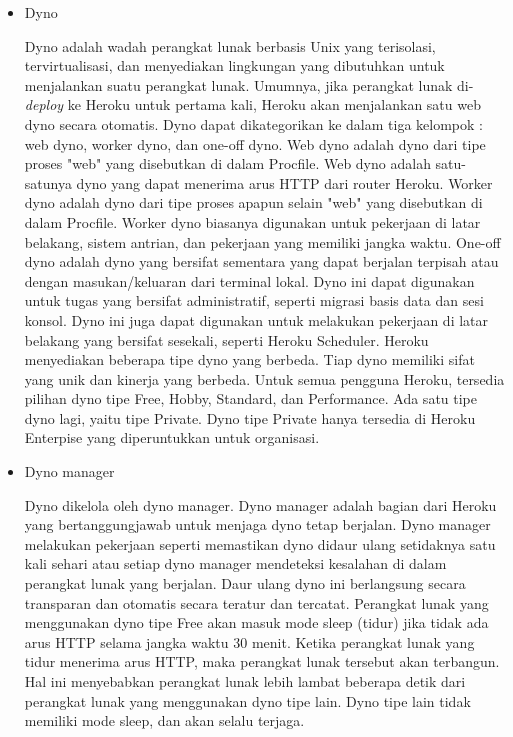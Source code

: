 \documentclass[a4paper,twoside]{article}
\begin{document}
\begin{enumerate}
\begin{itemize}
\begin{itemize}
\begin{itemize}
				\item Dyno
		
				Dyno adalah wadah perangkat lunak berbasis Unix yang terisolasi, tervirtualisasi, dan menyediakan lingkungan yang dibutuhkan untuk menjalankan suatu perangkat lunak. Umumnya, jika perangkat lunak di-\textit{deploy} ke Heroku untuk pertama kali, Heroku akan menjalankan satu web dyno secara otomatis. 
				Dyno dapat dikategorikan ke dalam tiga kelompok : web dyno, worker dyno, dan one-off dyno. Web dyno adalah dyno dari tipe proses "web" yang disebutkan di dalam Procfile. Web dyno adalah satu-satunya dyno yang dapat menerima arus HTTP dari router Heroku. Worker dyno adalah dyno dari tipe proses apapun selain "web" yang disebutkan di dalam Procfile. Worker dyno biasanya digunakan untuk pekerjaan di latar belakang, sistem antrian, dan pekerjaan yang memiliki jangka waktu. One-off dyno adalah dyno yang bersifat sementara yang dapat berjalan terpisah atau dengan masukan/keluaran dari terminal lokal. Dyno ini dapat digunakan untuk tugas yang bersifat administratif, seperti migrasi basis data dan sesi konsol. Dyno ini juga dapat digunakan untuk melakukan pekerjaan di latar belakang yang bersifat sesekali, seperti Heroku Scheduler.
				Heroku menyediakan beberapa tipe dyno yang berbeda. Tiap dyno memiliki sifat yang unik dan kinerja yang berbeda. Untuk semua pengguna Heroku, tersedia pilihan dyno tipe Free, Hobby, Standard, dan Performance. Ada satu tipe dyno lagi, yaitu tipe Private. Dyno tipe Private hanya tersedia di Heroku Enterpise yang diperuntukkan untuk organisasi.
		
				\item Dyno manager
		
				Dyno dikelola oleh dyno manager. Dyno manager adalah bagian dari Heroku yang bertanggungjawab untuk menjaga dyno tetap berjalan. Dyno manager melakukan pekerjaan seperti memastikan dyno didaur ulang setidaknya satu kali sehari atau setiap dyno manager mendeteksi kesalahan di dalam perangkat lunak yang berjalan. Daur ulang dyno ini berlangsung secara transparan dan otomatis secara teratur dan tercatat.
				Perangkat lunak yang menggunakan dyno tipe Free akan masuk mode sleep (tidur) jika tidak ada arus HTTP selama jangka waktu 30 menit. Ketika perangkat lunak yang tidur menerima arus HTTP, maka perangkat lunak tersebut akan terbangun. Hal ini menyebabkan perangkat lunak lebih lambat beberapa detik dari perangkat lunak yang menggunakan dyno tipe lain. Dyno tipe lain tidak memiliki mode sleep, dan akan selalu terjaga.
		

\end{itemize}
\end{itemize}
\end{itemize}
\end{enumerate}
\end{document}
